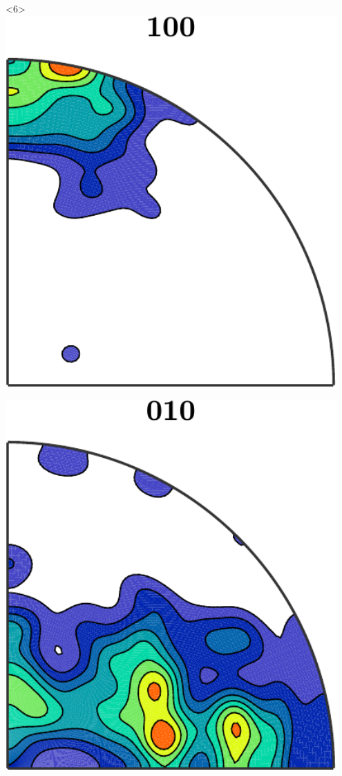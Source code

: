 \documentclass[compress]{beamer}
\begin{document}
\begin{frame}[fragile]
\begin{columns}
\begin{column}{3.5cm}
      \begin{onlyenv}<6>
        \includegraphics[width=0.95\textwidth]{pic/ipfSimple100Smooth}

        \medskip

        \includegraphics[width=0.95\textwidth]{pic/ipfSimple010Smooth}
      \end{onlyenv}
    \end{column}
  \end{columns}

\end{frame}
\end{document}
